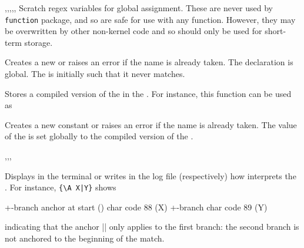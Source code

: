 \documentclass[oneside]{book}
\begin{document}
\begin{variable}{\gTmpaRegex,\gTmpbRegex,\gTmpcRegex,\gTmpiRegex,\gTmpjRegex,\gTmpkRegex}
Scratch regex variables for global assignment. These are never used by
\verb!function! package, and so are safe for use with any function.
However, they may be overwritten by other non-kernel
code and so should only be used for short-term storage.
\end{variable}

\begin{function}{\regexNew}
\begin{syntax}
 
\end{syntax}
Creates a new  or raises an error if the
name is already taken. The declaration is global. The
 is initially such that it never matches.
\end{function}

\begin{function}{\regexSet}
\begin{syntax}
  
\end{syntax}
Stores a compiled version of the  in the
. For instance, this function can be
used as
\begin{codehigh}
\regexNew \lMyRegex
\regexSet {}
\end{codehigh}
\end{function}

\begin{function}{\regexConst}
\begin{syntax}
  
\end{syntax}
Creates a new constant  or raises an error if the name
is already taken.  The value of the  is set
globally to the compiled version of the .
\end{function}

\begin{function}{\regexLog,\regexVarLog,\regexShow,\regexVarShow}
\begin{syntax}
 
 
 
 
\end{syntax}
Displays in the terminal or writes in the log file (respectively)
how  interprets the . For instance,
 \verb+{\A X|Y}+ shows
\begin{codehigh}
+-branch
  anchor at start (\A)
  char code 88 (X)
+-branch
  char code 89 (Y)
\end{codehigh}
indicating that the anchor |\A| only applies to the first branch:
the second branch is not anchored to the beginning of the match.
\end{function}
\end{document}
